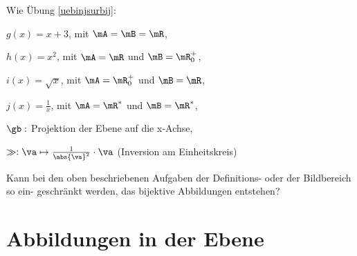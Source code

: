 \documentclass[%
11pt,%
twoside,%
titlepage,%
german,%
headsepline%
]{scrartcl}
\begin{document}
\begin{ueb}
Wie \"Ubung \ref{uebinjsurbij}:

\begin{enumeratea}
\addtocounter{enumi}{2}
\item $g(x)=x+3$, mit $\mA=\mB=\mR$,
\item $h(x)=x^2$, mit $\mA=\mR$ und $\mB=\mR^+_0$,
\item $i(x)=\sqrt{x}$, mit $\mA=\mR^+_0$ und $\mB=\mR$,
\item $j(x)=\frac{1}{x}$, mit $\mA=\mR^*$ und $\mB=\mR^*$,
\item $\gb:$ Projektion der Ebene auf die x-Achse,
\item $\gg:\va\mapsto\frac{1}{\abs{\va}^2}\cdot\va$ (Inversion am Einheitskreis)
\end{enumeratea}
\end{ueb}

\begin{ueb}
Kann bei den oben beschriebenen Aufgaben der Definitions- oder der Bildbereich so ein- geschränkt werden, das bijektive Abbildungen entstehen?
\end{ueb}

\clearpage

\section{Abbildungen in der Ebene}
\end{document}
